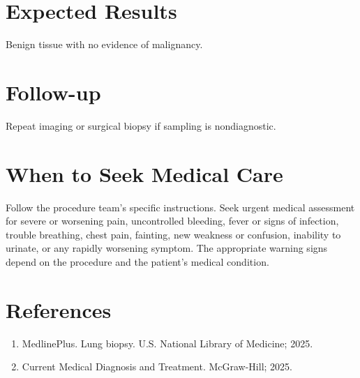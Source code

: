 \section*{Expected Results}
Benign tissue with no evidence of malignancy.

\section*{Follow-up}
Repeat imaging or surgical biopsy if sampling is nondiagnostic.

\section*{When to Seek Medical Care}
Follow the procedure team's specific instructions. Seek urgent medical assessment for severe or worsening pain, uncontrolled bleeding, fever or signs of infection, trouble breathing, chest pain, fainting, new weakness or confusion, inability to urinate, or any rapidly worsening symptom. The appropriate warning signs depend on the procedure and the patient's medical condition.

\section*{References}
\begin{enumerate}
  \item MedlinePlus. Lung biopsy. U.S. National Library of Medicine; 2025.
  \item Current Medical Diagnosis and Treatment. McGraw-Hill; 2025.
\end{enumerate}

\clearpage
